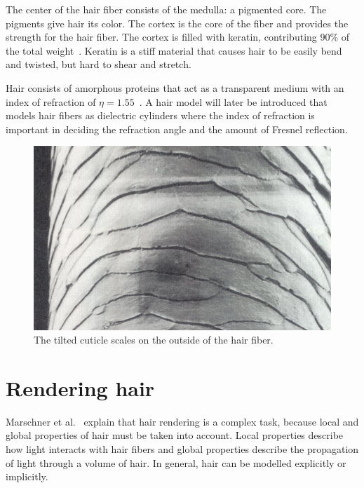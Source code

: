 \documentclass[11pt,a4paper]{report}
\begin{document}
The center of the hair fiber consists of the medulla: a pigmented core. The pigments give hair its color. The cortex is the core of the fiber and provides the strength for the hair fiber. The cortex is filled with keratin, contributing 90\% of the total weight~\cite{ward}. Keratin is a stiff material that causes hair to be easily bend and twisted, but hard to shear and stretch.

Hair consists of amorphous proteins that act as a transparent medium with an index of refraction of $\eta = 1.55$~\cite{ward}. A hair model will later be introduced that models hair fibers as dielectric cylinders where the index of refraction is important in deciding the refraction angle and the amount of Fresnel reflection.

\begin{figure}[h]
\begin{center}
\includegraphics[scale=0.4]{images/hair_structure.jpeg}
\caption{The tilted cuticle scales on the outside of the hair fiber.}
\label{fig_hair_structure}
\end{center}
\end{figure}



\section{Rendering hair}

Marschner et al.~\cite{marschner} explain that hair rendering is a complex task, because local and global properties of hair must be taken into account. Local properties describe how light interacts with hair fibers and global properties describe the propagation of light through a volume of hair. In general, hair can be modelled explicitly or implicitly.
\end{document}
